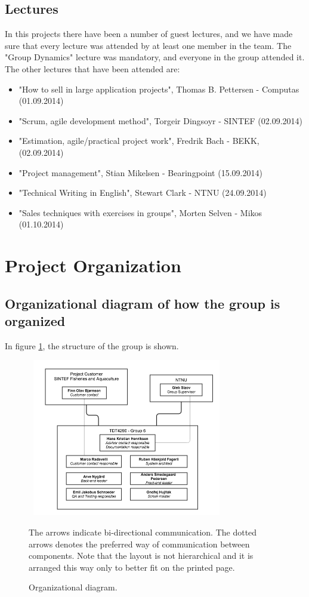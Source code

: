 \documentclass[11pt,a4paper,titlepage,oneside]{report}
\begin{document}
\subsection{Lectures}
In this projects there have been a number of guest lectures, and we have made sure that every lecture was attended by at least one member in the team.
The "Group Dynamics" lecture was mandatory, and everyone in the group attended it.
The other lectures that have been attended are:
\begin{itemize}
\item "How to sell in large application projects", Thomas B. Pettersen - Computas (01.09.2014)
\item "Scrum, agile development method", Torgeir Dingsoyr - SINTEF (02.09.2014)
\item "Estimation, agile/practical project work", Fredrik Bach - BEKK, (02.09.2014)
\item "Project management", Stian Mikelsen - Bearingpoint (15.09.2014)
\item "Technical Writing in English", Stewart Clark - NTNU (24.09.2014)
\item "Sales techniques with exercises in groups", Morten Selven - Mikos (01.10.2014)
\end{itemize}

\section{Project Organization}
\subsection{Organizational diagram of how the group is organized}
In figure \ref{fig:organizational-structure}, the structure of the group is shown. 

\begin{figure}[h]
\begin{center}
\includegraphics[height=260px,width=328px]{img/tdt4290_group_6_organizational_structure.png}
\caption{Organizational diagram.}
\label{fig:organizational-structure}
\medskip
\small
The arrows indicate bi-directional communication. The dotted arrows denotes the preferred way of communication between components. Note that the layout is not hierarchical and it is arranged this way only to better fit on the printed page.
\end{center}
\end{figure}
\end{document}
